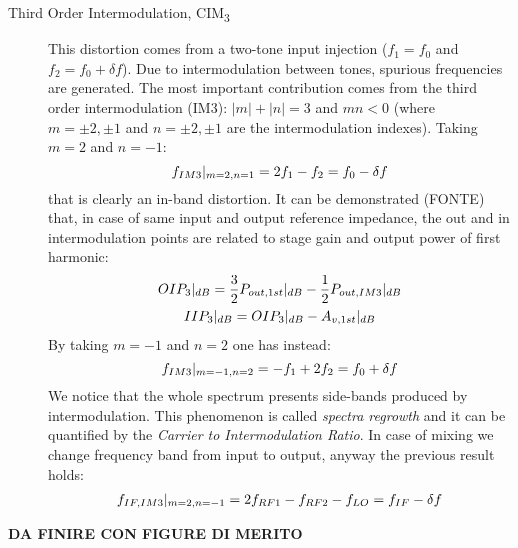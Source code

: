 \begin{description}
	\item [Third Order Intermodulation, CIM\textsubscript{3}] This distortion comes from a two-tone input injection ($f_1 = f_0$ and $f_2=f_0+\delta f$). Due to intermodulation between tones, spurious frequencies are generated. The most important contribution comes from the third order intermodulation (IM3): $|m|+|n|=3$ and $mn<0$ (where $m=\pm2,\pm1$ and $n=\pm2,\pm1$ are the intermodulation indexes). Taking $m=2$ and $n=-1$:
	\begin{equation}
		f_{IM3}|_{m=2,n=1} =  2f_1 - f_2 = f_0 - \delta f \notag
	\end{equation}
	that is clearly an in-band distortion.
	It can be demonstrated (FONTE) that, in case of same input and output reference impedance, the out and in intermodulation points are related to stage gain and output power of first harmonic:
	\begin{gather}
	OIP_3|_{dB} = \frac{3}{2}P_{out,1st}|_{dB}-\frac{1}{2}P_{out,IM3}|_{dB} \notag \\
	IIP_3|_{dB} = OIP_3|_{dB}-A_{v,1st}|_{dB} \notag
	\end{gather} 
	By taking $m=-1$ and $n=2$ one has instead:
	\begin{equation}
	f_{IM3}|_{m=-1,n=2} =  -f_1 +2 f_2 = f_0 + \delta f \notag
	\end{equation} 
	We notice that the whole spectrum presents side-bands produced by intermodulation. This phenomenon is called \emph{spectra regrowth} and it can be quantified by the \emph{Carrier to Intermodulation Ratio}.
	In case of mixing we change frequency band from input to output, anyway the previous result holds:
	\begin{gather}
			f_{IF,IM3}|_{m=2,n=-1} = 2f_{RF1} - f_{RF2} -f_{LO}= f_{IF} - \delta f \notag
	\end{gather}
\end{description}

\textbf{DA FINIRE CON FIGURE DI MERITO}